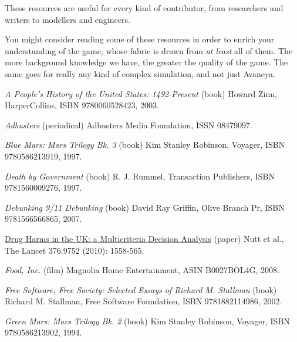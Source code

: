 
These resources are useful for every kind of contributor, from researchers and writers to modellers and engineers.

You might consider reading some of these resources in order to enrich your understanding of the game, whose fabric is drawn from {\it at least} all of them. The more background knowledge we have, the greater the quality of the game. The same goes for really any kind of complex simulation, and not just Avaneya.

\startitemize[3]
\setupwhitespace[big]
\item
{\it A People's History of the United States: 1492-Present} (book)\crlf
Howard Zinn, HarperCollins, ISBN 9780060528423, 2003.

\item
{\it Adbusters} (periodical)\crlf
Adbusters Media Foundation, ISSN 08479097.

\item
{\it Blue Mars: Mars Trilogy Bk. 3} (book)\crlf
Kim Stanley Robinson, Voyager, ISBN 9780586213919, 1997.

\item
{\it Death by Government} (book)\crlf
R. J. Rummel, Transaction Publishers, ISBN 9781560009276, 1997.

\item
{\it Debunking 9/11 Debunking} (book)\crlf
David Ray Griffin, Olive Branch Pr, ISBN 9781566566865, 2007.

\item
\href{http://is.gd/QXTVmH}{Drug Harms in the UK: a Multicriteria Decision Analysis} (paper)\crlf
Nutt et al., The Lancet 376.9752 (2010): 1558-565.

\item
{\it Food, Inc.} (film)\crlf
Magnolia Home Entertainment, ASIN B0027BOL4G, 2008.

\item
{\it Free Software, Free Society: Selected Essays of Richard M. Stallman} (book)\crlf
Richard M. Stallman, Free Software Foundation, ISBN 9781882114986, 2002.

\item
{\it Green Mars: Mars Trilogy Bk. 2} (book)\crlf
Kim Stanley Robinson, Voyager, ISBN 9780586213902, 1994.

